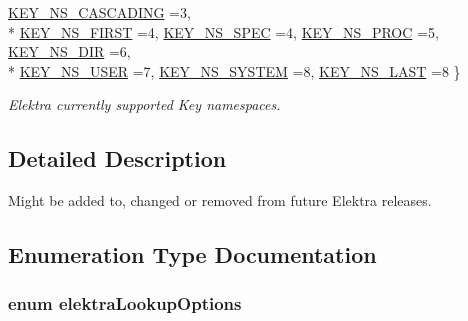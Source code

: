 \begin{DoxyCompactItemize}
\hyperlink{group__proposal_ggaec3b8d6f430ae49b91bafe8a86310a68a2c9133e3095dccbcde5ca3bb13987b5d}{K\+E\+Y\+\_\+\+N\+S\+\_\+\+C\+A\+S\+C\+A\+D\+I\+N\+G} =3, 
\\*
\hyperlink{group__proposal_ggaec3b8d6f430ae49b91bafe8a86310a68ae06281f94c2b7a221115afbaa1e0ff45}{K\+E\+Y\+\_\+\+N\+S\+\_\+\+F\+I\+R\+S\+T} =4, 
\hyperlink{group__proposal_ggaec3b8d6f430ae49b91bafe8a86310a68a2be047b124b1ca0e92b5ef124169f0d2}{K\+E\+Y\+\_\+\+N\+S\+\_\+\+S\+P\+E\+C} =4, 
\hyperlink{group__proposal_ggaec3b8d6f430ae49b91bafe8a86310a68a470ecc9254fcdfccf9923a3e526c9c11}{K\+E\+Y\+\_\+\+N\+S\+\_\+\+P\+R\+O\+C} =5, 
\hyperlink{group__proposal_ggaec3b8d6f430ae49b91bafe8a86310a68aa0006cf27dbb2586bafba6ff1ae4f4ec}{K\+E\+Y\+\_\+\+N\+S\+\_\+\+D\+I\+R} =6, 
\\*
\hyperlink{group__proposal_ggaec3b8d6f430ae49b91bafe8a86310a68a8ce23c70010e8ac8bb540b0947e03a4e}{K\+E\+Y\+\_\+\+N\+S\+\_\+\+U\+S\+E\+R} =7, 
\hyperlink{group__proposal_ggaec3b8d6f430ae49b91bafe8a86310a68a61adca2f9dff47e65dfcdb492ffa7a20}{K\+E\+Y\+\_\+\+N\+S\+\_\+\+S\+Y\+S\+T\+E\+M} =8, 
\hyperlink{group__proposal_ggaec3b8d6f430ae49b91bafe8a86310a68ad4d0f219a657517ddd50cd06c8190310}{K\+E\+Y\+\_\+\+N\+S\+\_\+\+L\+A\+S\+T} =8
 \}
\begin{DoxyCompactList}\small\item\em Elektra currently supported Key namespaces. \end{DoxyCompactList}\end{DoxyCompactItemize}


\subsection{Detailed Description}
Might be added to, changed or removed from future Elektra releases. 



\subsection{Enumeration Type Documentation}
\hypertarget{group__proposal_ga93673533c4c8eb1fdfca76b98c5f49b0}{
\subsubsection[{elektra\+Lookup\+Options}]{\setlength{\rightskip}{0pt plus 5cm}enum {\bf elektra\+Lookup\+Options}}}\label{group__proposal_ga93673533c4c8eb1fdfca76b98c5f49b0}


